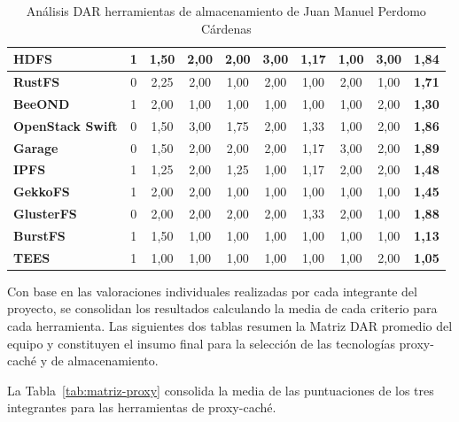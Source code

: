 \begin{table}[H]
\begin{tabular}{|>{\raggedright\arraybackslash\bfseries}p{2.7cm}|c|c|c|c|c|c|c|c|c|}
HDFS & 1 & 1,50 & 2,00 & 2,00 & 3,00 & 1,17 & 1,00 & 3,00 & \textbf{1,84} \\ \hline
\rowcolor{gridrow} RustFS & 0 & 2,25 & 2,00 & 1,00 & 2,00 & 1,00 & 2,00 & 1,00 & \textbf{1,71} \\ \hline
BeeOND & 1 & 2,00 & 1,00 & 1,00 & 1,00 & 1,00 & 1,00 & 2,00 & \textbf{1,30} \\ \hline
\rowcolor{gridrow} OpenStack Swift & 0 & 1,50 & 3,00 & 1,75 & 2,00 & 1,33 & 1,00 & 2,00 & \textbf{1,86} \\ \hline
Garage & 0 & 1,50 & 2,00 & 2,00 & 2,00 & 1,17 & 3,00 & 2,00 & \textbf{1,89} \\ \hline
\rowcolor{gridrow} IPFS & 1 & 1,25 & 2,00 & 1,25 & 1,00 & 1,17 & 2,00 & 2,00 & \textbf{1,48} \\ \hline
GekkoFS & 1 & 2,00 & 2,00 & 1,00 & 1,00 & 1,00 & 1,00 & 1,00 & \textbf{1,45} \\ \hline
\rowcolor{gridrow} GlusterFS & 0 & 2,00 & 2,00 & 2,00 & 2,00 & 1,33 & 2,00 & 1,00 & \textbf{1,88} \\ \hline
BurstFS & 1 & 1,50 & 1,00 & 1,00 & 1,00 & 1,00 & 1,00 & 1,00 & \textbf{1,13} \\ \hline
\rowcolor{gridrow} TEES & 1 & 1,00 & 1,00 & 1,00 & 1,00 & 1,00 & 1,00 & 2,00 & \textbf{1,05} \\ \hline
\end{tabular}
\caption{Análisis DAR herramientas de almacenamiento de Juan Manuel Perdomo Cárdenas}
\label{tab:dar-almac-jmp}
\end{table}

Con base en las valoraciones individuales realizadas por cada integrante
del proyecto, se consolidan los resultados calculando la media de cada
criterio para cada herramienta. Las siguientes dos tablas resumen la
Matriz DAR promedio del equipo y constituyen el insumo final para la
selección de las tecnologías proxy-caché y de almacenamiento.

La Tabla~\ref{tab:matriz-proxy} consolida la media de las puntuaciones de los tres
integrantes para las herramientas de proxy-caché.

